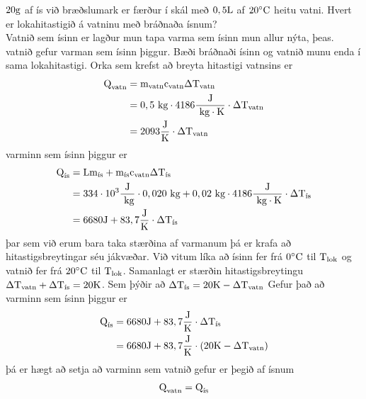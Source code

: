 \begin{formalexample}
$20 \textrm{g}$ af ís við bræðslumark er færður í skál með $0,5 \text{L}$ af $20 
^{\circ}\text{C}$ heitu vatni. Hvert er lokahitastigið á vatninu með bráðnaða ísnum?
\\[4 ex]
Vatnið sem ísinn er lagður mun tapa varma sem ísinn mun allur nýta, þeas. vatnið
gefur varman sem ísinn þiggur. Bæði bráðnaði ísinn og vatnið munu enda í sama 
lokahitastigi. Orka sem krefst að breyta hitastigi vatnsins er
\begin{align*}
	\text{Q}_\text{vatn} &= \textrm{m}_\text{vatn} \text{c}_\text{vatn}\Delta \text{T}_\text{vatn} \\
		&= 0,5 \textrm{ k}\textrm{g} \cdot 4186 \frac{\textrm{J}}{\textrm{ k}\textrm{g} \cdot \text{K}} \cdot \Delta \text{T}_\text{vatn} \\
		&= 2093 \frac{\textrm{J}}{\text{K}} \cdot \Delta \text{T}_\text{vatn}
\end{align*}
varminn sem ísinn þiggur er
\begin{align*}
	\text{Q}_\text{ís} &= \text{L} \textrm{m}_\text{ís} 
		+ \textrm{m}_\text{ís} \text{c}_\text{vatn}\Delta \text{T}_\text{ís} \\
		&= 334 \cdot 10^{3} \frac{\textrm{J}}{\textrm{ k}\textrm{g}} \cdot 0,020 \textrm{ k}\textrm{g} 
			+ 0,02 \textrm{ k}\textrm{g} \cdot 4186 \frac{\textrm{J}}{\textrm{ k}\textrm{g} \cdot \text{K}} \cdot \Delta \text{T}_\text{ís} \\
		&= 6680 \textrm{J} +  83,7 \frac{\textrm{J}}{\text{K}} \cdot \Delta \text{T}_\text{ís}
\end{align*}
þar sem við erum bara taka stærðina af varmanum þá er krafa að hitastigsbreytingar
séu jákvæðar. Við vitum líka að ísinn fer frá $0 ^{\circ}\text{C}$ til 
$\text{T}_\text{lok}$ og vatnið fer frá $20 ^{\circ}\text{C}$ til $\text{T}_\text{lok}$.
Samanlagt er stærðin hitastigsbreytingu 
$\Delta \text{T}_\text{vatn} + \Delta \text{T}_\text{ís} = 20 \text{K}$.
Sem þýðir að $\Delta \text{T}_\text{ís} = 20 \text{K} - \Delta \text{T}_\text{vatn}$
Gefur það að varminn sem ísinn þiggur er
\begin{align*}
	\text{Q}_\text{ís}  &= 6680 \textrm{J} +  83,7 \frac{\textrm{J}}{\text{K}} \cdot \Delta \text{T}_\text{ís} \\
		&= 6680 \textrm{J} +  83,7 \frac{\textrm{J}}{\text{K}} \cdot \left(20 \text{K} - \Delta \text{T}_\text{vatn} \right)
\end{align*}
þá er hægt að setja að varminn sem vatnið gefur er þegið af ísnum
\begin{align*}
	\uthermaleng_\text{vatn} &=  \uthermaleng_\text{ís} \\

\end{align*}
\end{formalexample}

